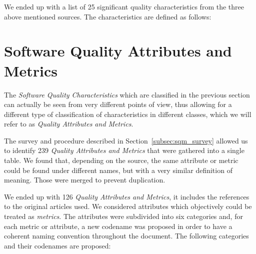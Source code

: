 \documentclass[a4paper]{article}
\begin{document}
We ended up with a list of 25 significant quality characteristics from the three above mentioned sources. The characteristics are defined as follows:



\newpage
\section{Software Quality Attributes and Metrics}
\label{subsec:SW_quality_attributes}

The \textit{Software Quality Characteristics} which are classified in the previous section can actually be seen from very different points of view, thus allowing for a different type of classification of characteristics in different classes, which we will refer to as \textit{Quality Attributes and Metrics}.

The survey and procedure described in Section~\ref{subsec:sqm_survey} allowed us to identify 239 \textit{Quality Attributes and Metrics} that were gathered into a single table. We found that, depending on the source, the same attribute or metric could be found under different names, but with a very similar definition of meaning. Those were merged to prevent duplication.

We ended up with 126 \textit{Quality Attributes and Metrics}, it includes the references to the original articles used. We considered attributes which objectively could be treated as \textit{metrics}. The attributes were subdivided into six categories and, for each metric or attribute, a new codename was proposed in order to have a coherent naming convention throughout the document. The following categories and their codenames are proposed:
\end{document}
